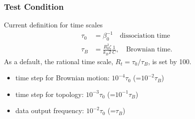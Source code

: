 \documentclass[slidestop, compress, mathserif]{beamer}
\begin{document}
\begin{frame}
  \frametitle<presentation>{Test Condition}
  \begin{block}{Current definition for time scales}
  \begin{align}
    \tau_0 &= \beta_0^{-1}\quad\textrm{dissociation time}\\
    \tau_B &= \frac{R_0^2\zeta}{k_BT}\frac{1}{C},\quad\textrm{Brownian time}.
  \end{align}
  As a default, the rational time scale, $R_t = \tau_0/\tau_B$, is set by 100.
  \end{block}
  \begin{itemize}
  \item time step for Brownian motion: $10^{-4}\tau_0$ (=$10^{-2}\tau_B$)
  \item time step for topology: $10^{-3}\tau_0$ (=$10^{-1}\tau_B$)
  \item data output frequency: $10^{-2}\tau_0$ (=$\tau_B$)
  \end{itemize}
\end{frame}
\end{document}
